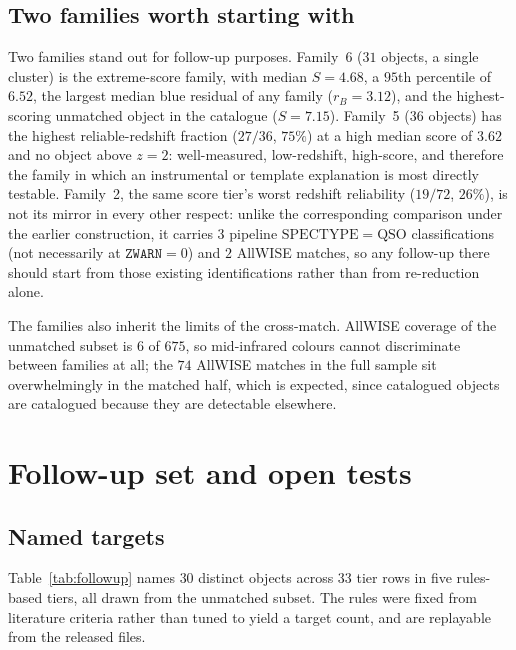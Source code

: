\documentclass[aps,prd,twocolumn,superscriptaddress,nofootinbib,longbibliography,floatfix]{revtex4-2}
\newcommand{\ZWARN}{\texttt{ZWARN}}
\begin{document}
\subsection{Two families worth starting with}
Two families stand out for follow-up purposes. Family~6 ($31$ objects, a
single cluster) is the extreme-score family, with median $S = 4.68$, a
$95$th percentile of $6.52$, the largest median blue residual of any family
($r_B = 3.12$), and the highest-scoring unmatched object in the catalogue
($S = 7.15$).
Family~5 ($36$ objects) has the highest reliable-redshift fraction ($27/36$,
$75\%$) at a high median score of $3.62$ and no object above
$z = 2$: well-measured, low-redshift, high-score, and therefore the family in
which an instrumental or template explanation is most directly
testable.
Family~2, the same score tier's worst redshift reliability ($19/72$,
$26\%$), is not its mirror in every other respect: unlike the corresponding
comparison under the earlier construction, it carries $3$ pipeline
$\mathrm{SPECTYPE}=\mathrm{QSO}$ classifications (not necessarily at
$\ZWARN=0$) and $2$ AllWISE matches, so any follow-up there should
start from those existing identifications rather than from re-reduction
alone.

The families also inherit the limits of the cross-match. AllWISE coverage of
the unmatched subset is $6$ of $675$,
so mid-infrared colours cannot discriminate between families at all; the $74$
AllWISE matches in the full sample sit overwhelmingly in the matched half,
which is expected, since catalogued objects are catalogued because they are
detectable elsewhere.

\section{Follow-up set and open tests}
\label{sec:followup}

\subsection{Named targets}
Table~\ref{tab:followup} names $30$ distinct objects across $33$ tier rows in
five rules-based tiers, all drawn from the unmatched
subset.
The rules were fixed from literature criteria rather than tuned to yield a
target count, and are replayable from the released files.
\end{document}
